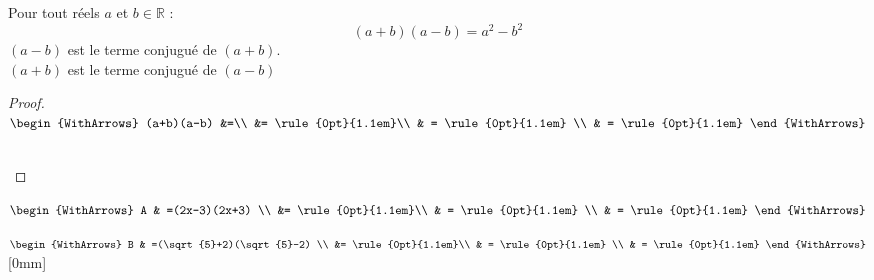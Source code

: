 \documentclass[main.tex]{subfiles}
\begin{document}
\begin{theorem}
	Pour tout réels $a$ et $b\in\mathbb{R}$ :
	\setlength{\abovedisplayskip}{3pt}
	\setlength{\belowdisplayskip}{3pt}
	\[
		(a+b)(a-b) =a^2- b^2  
	\]
	$(a-b)$ est le terme conjugué de $(a+b)$.\\
	$(a+b)$ est le terme conjugué de $(a-b)$
\end{theorem}
\begin{proof}\hfill
	
	\noindent \parbox{0.85\linewidth}{	
		$\begin{WithArrows}
			(a+b)(a-b) &=\\
			&= \rule{0pt}{1.1em}\\
			& = \rule{0pt}{1.1em}  \\
			& = \rule{0pt}{1.1em}  
		\end{WithArrows}$ 	
	} \\
	\null
\end{proof} 
\begin{example}\hfill 
	
	\noindent \parbox{0.45\linewidth}{	
		$\begin{WithArrows}
			A & =(2x-3)(2x+3) \\
			&= \rule{0pt}{1.1em}\\
			& = \rule{0pt}{1.1em}  \\
			& = \rule{0pt}{1.1em}  
		\end{WithArrows}$ 	
	}\hfill\parbox{0.45\linewidth}{	
		$\begin{WithArrows}
			B & =(\sqrt{5}+2)(\sqrt{5}-2) \\
			&= \rule{0pt}{1.1em}\\
			& = \rule{0pt}{1.1em}  \\
			& = \rule{0pt}{1.1em}  
		\end{WithArrows}$ 
	}
\end{example}  


\newpage 
{}  
\pagestyle{scrheadings} %
\onehalfspacing
\end{document}
